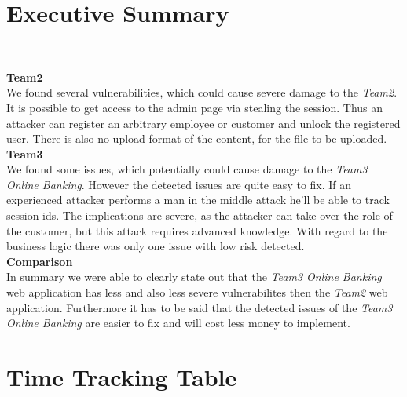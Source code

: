\documentclass[headsepline,footsepline,footinclude=false,oneside,fontsize=11pt,paper=a4,listof=totoc,bibliography=totoc]{scrbook} %
\begin{document}


\frontmatter{}


{
	\chapter{Executive Summary}\

   \textbf{Team2}\\

	We found several vulnerabilities, which could cause severe damage to the \textit{Team2}. It is possible to get access to the admin page via stealing the session. Thus an attacker can register an arbitrary employee or customer and unlock the registered user. There is also no upload format of the content, for the file to be uploaded.\\


	\textbf{Team3}\\

	We found some issues, which potentially could cause damage to the \textit{Team3 Online Banking}. However the detected issues are quite easy to fix. If an experienced attacker performs a man in the middle attack he'll be able to track session ids. The implications are severe, as the	attacker can take over the role of the customer, but this attack requires advanced knowledge. With regard to the business logic there was only one issue with low risk detected. \\

	\textbf{Comparison}\\

	In summary we were able to clearly state out that the \textit{Team3 Online Banking} web application has less and also less severe vulnerabilites then the \textit{Team2} web application. Furthermore it has to be said that the detected issues of the \textit{Team3 Online Banking} are easier to fix and will cost less money to implement.
}

\pagebreak
%
%
%
%
\tableofcontents{}
\mainmatter{}

\chapter{Time Tracking Table}
\end{document}
